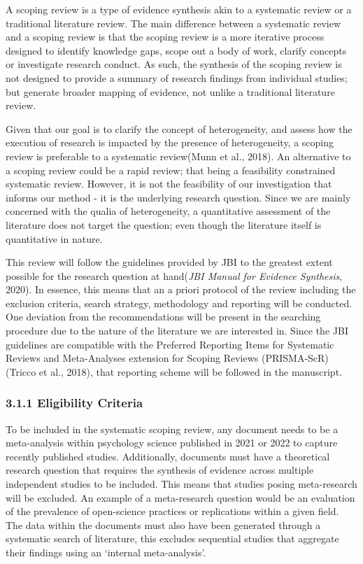 \documentclass[
  letterpaper,
  DIV=11,
  numbers=noendperiod]{scrartcl}
\begin{document}
A scoping review is a type of evidence synthesis akin to a systematic
review or a traditional literature review. The main difference between a
systematic review and a scoping review is that the scoping review is a
more iterative process designed to identify knowledge gaps, scope out a
body of work, clarify concepts or investigate research conduct. As such,
the synthesis of the scoping review is not designed to provide a summary
of research findings from individual studies; but generate broader
mapping of evidence, not unlike a traditional literature review.

Given that our goal is to clarify the concept of heterogeneity, and
assess how the execution of research is impacted by the presence of
heterogeneity, a scoping review is preferable to a systematic
review(Munn et al., 2018). An alternative to a scoping review could be a
rapid review; that being a feasibility constrained systematic review.
However, it is not the feasibility of our investigation that informs our
method - it is the underlying research question. Since we are mainly
concerned with the qualia of heterogeneity, a quantitative assessment of
the literature does not target the question; even though the literature
itself is quantitative in nature.

This review will follow the guidelines provided by JBI to the greatest
extent possible for the research question at hand(\emph{{JBI} {Manual}
for {Evidence} {Synthesis}}, 2020). In essence, this means that an a
priori protocol of the review including the exclusion criteria, search
strategy, methodology and reporting will be conducted. One deviation
from the recommendations will be present in the searching procedure due
to the nature of the literature we are interested in. Since the JBI
guidelines are compatible with the Preferred Reporting Items for
Systematic Reviews and Meta-Analyses extension for Scoping Reviews
(PRISMA-ScR) (Tricco et al., 2018), that reporting scheme will be
followed in the manuscript.

\hypertarget{eligibility-criteria}{%
\subsubsection{3.1.1 Eligibility Criteria}\label{eligibility-criteria}}

To be included in the systematic scoping review, any document needs to
be a meta-analysis within psychology science published in 2021 or 2022
to capture recently published studies. Additionally, documents must have
a theoretical research question that requires the synthesis of evidence
across multiple independent studies to be included. This means that
studies posing meta-research will be excluded. An example of a
meta-research question would be an evaluation of the prevalence of
open-science practices or replications within a given field. The data
within the documents must also have been generated through a systematic
search of literature, this excludes sequential studies that aggregate
their findings using an `internal meta-analysis'.
\end{document}

